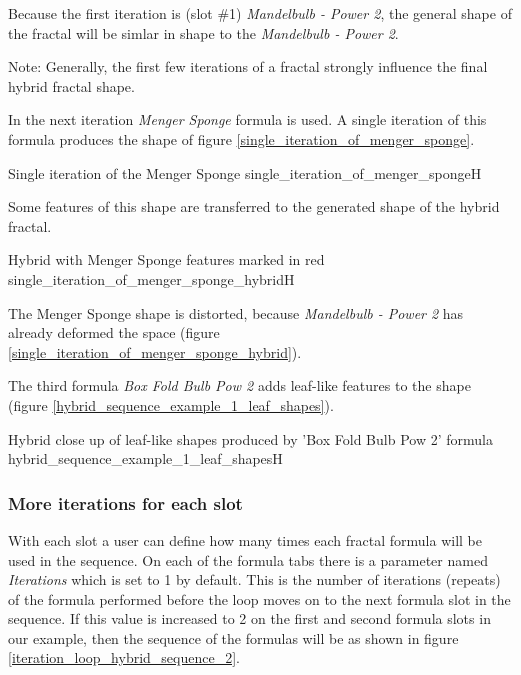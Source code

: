 Because the first iteration is (slot \#1) \emph{Mandelbulb - Power 2}, the general shape
of the fractal will be simlar in shape to the \emph{Mandelbulb - Power 2}.

Note: Generally, the first few iterations of a fractal strongly influence the final hybrid fractal shape.

In the next iteration \emph{Menger Sponge} formula is used. A single iteration
of this formula produces the shape of figure \ref{single_iteration_of_menger_sponge}.

{Single iteration of the Menger Sponge}
{single_iteration_of_menger_sponge}{H}

Some features of this shape are transferred to the generated shape of the hybrid fractal.

{Hybrid with Menger Sponge features marked in red}
{single_iteration_of_menger_sponge_hybrid}{H}

The Menger Sponge shape is distorted, because \emph{Mandelbulb - Power 2} has
already deformed the space (figure \ref{single_iteration_of_menger_sponge_hybrid}).

The third formula \emph{Box Fold Bulb Pow 2} adds leaf-like features to the shape (figure \ref{hybrid_sequence_example_1_leaf_shapes}).

{Hybrid close up of leaf-like shapes produced by 'Box Fold Bulb Pow 2' formula}
{hybrid_sequence_example_1_leaf_shapes}{H}

\subsubsection{More iterations for each slot}

With each slot a user can define how many times each fractal formula will be used in the sequence.
On each of the formula tabs there is a parameter named \emph{Iterations} which is set to 1 by default.
This is the number of iterations (repeats) of the formula performed before the loop moves on to the next formula slot in the sequence.
If this value is increased to 2 on the first and second formula slots in our example,
then the sequence of the formulas will be as shown in figure \ref{iteration_loop_hybrid_sequence_2}. \label{two-iterations-per-slot}

